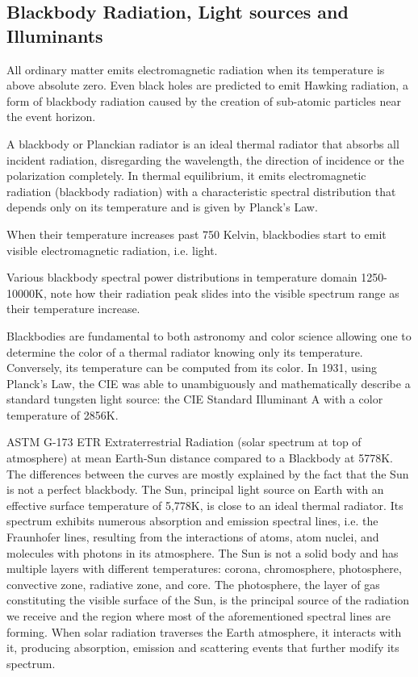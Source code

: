 \subsection{Blackbody Radiation, Light sources and Illuminants}

All ordinary matter emits electromagnetic radiation when its temperature is above absolute zero. Even black holes are predicted to emit Hawking radiation, a form of blackbody radiation caused by the creation of sub-atomic particles near the event horizon. 

A blackbody or Planckian radiator is an ideal thermal radiator that absorbs all incident radiation, disregarding the wavelength, the direction of incidence or the polarization completely. In thermal equilibrium, it emits electromagnetic radiation (blackbody radiation) with a characteristic spectral distribution that depends only on its temperature and is given by Planck's Law.



When their temperature increases past 750 Kelvin, blackbodies start to emit visible electromagnetic radiation, i.e. light.

Various blackbody spectral power distributions in temperature domain 1250-10000K, note how their radiation peak slides into the visible spectrum range as their temperature increase.

Blackbodies are fundamental to both astronomy and color science allowing one to determine the color of a thermal radiator knowing only its temperature. Conversely, its temperature can be computed from its color.
In 1931, using Planck's Law, the CIE was able to unambiguously and mathematically describe a standard tungsten light source: the CIE Standard Illuminant A with a color temperature of 2856K. 


ASTM G-173 ETR Extraterrestrial Radiation (solar spectrum at top of atmosphere) at mean Earth-Sun distance compared to a Blackbody at 5778K. The differences between the curves are mostly explained by the fact that the Sun is not a perfect blackbody.
The Sun, principal light source on Earth with an effective surface temperature of 5,778K, is close to an ideal thermal radiator. Its spectrum exhibits numerous absorption and emission spectral lines, i.e. the Fraunhofer lines, resulting from the interactions of atoms, atom nuclei, and molecules with photons in its atmosphere. The Sun is not a solid body and has multiple layers with different temperatures: corona, chromosphere, photosphere, convective zone, radiative zone, and core. The photosphere, the layer of gas constituting the visible surface of the Sun, is the principal source of the radiation we receive and the region where most of the aforementioned spectral lines are forming. When solar radiation traverses the Earth atmosphere, it interacts with it, producing absorption, emission and scattering events that further modify its spectrum.

